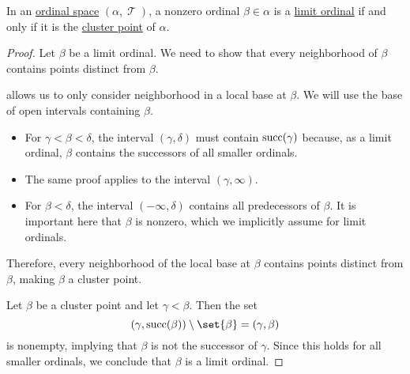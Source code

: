 \begin{proposition}\label{thm:limit_ordinal_order_topology}
  In an \hyperref[def:ordinal_space]{ordinal space} \( (\alpha, \mscrT) \), a nonzero ordinal \( \beta \in \alpha \) is a \hyperref[def:successor_and_limit_ordinal]{limit ordinal} if and only if it is the \hyperref[def:set_cluster_point]{cluster point} of \( \alpha \).
\end{proposition}
\begin{proof}
  \SufficiencySubProof Let \( \beta \) be a limit ordinal. We need to show that every neighborhood of \( \beta \) contains points distinct from \( \beta \).

   allows us to only consider neighborhood in a local base at \( \beta \). We will use the base of open intervals containing \( \beta \).
  \begin{itemize}
    \item For \( \gamma < \beta < \delta \), the interval \( (\gamma, \delta) \) must contain \( \operatorname{succ}(\gamma) \) because, as a limit ordinal, \( \beta \) contains the successors of all smaller ordinals.

    \item The same proof applies to the interval \( (\gamma, \infty) \).

    \item For \( \beta < \delta \), the interval \( (-\infty, \delta) \) contains all predecessors of \( \beta \). It is important here that \( \beta \) is nonzero, which we implicitly assume for limit ordinals.
  \end{itemize}

  Therefore, every neighborhood of the local base at \( \beta \) contains points distinct from \( \beta \), making \( \beta \) a cluster point.

  \NecessitySubProof Let \( \beta \) be a cluster point and let \( \gamma < \beta \). Then the set
  \begin{equation*}
    (\gamma, \op{succ}(\beta)) \setminus \set{ \beta }
    =
    (\gamma, \beta)
  \end{equation*}
  is nonempty, implying that \( \beta \) is not the successor of \( \gamma \). Since this holds for all smaller ordinals, we conclude that \( \beta \) is a limit ordinal.
\end{proof}
